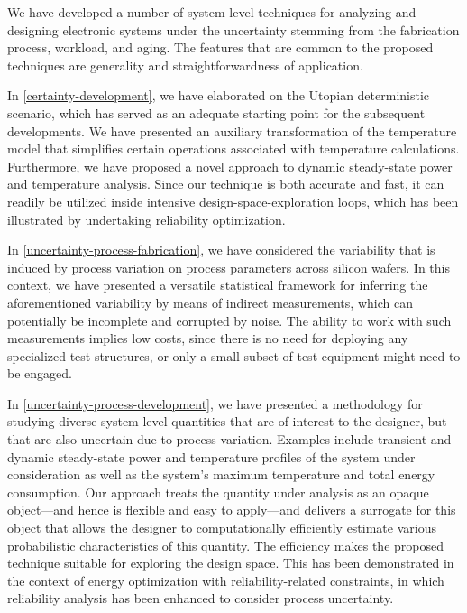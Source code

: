 We have developed a number of system-level techniques for analyzing and
designing electronic systems under the uncertainty stemming from the fabrication
process, workload, and aging. The features that are common to the proposed
techniques are generality and straightforwardness of application.

In \cref{certainty-development}, we have elaborated on the Utopian deterministic
scenario, which has served as an adequate starting point for the subsequent
developments. We have presented an auxiliary transformation of the temperature
model that simplifies certain operations associated with temperature
calculations. Furthermore, we have proposed a novel approach to dynamic
steady-state power and temperature analysis. Since our technique is both
accurate and fast, it can readily be utilized inside intensive
design-space-exploration loops, which has been illustrated by undertaking
reliability optimization.

In \cref{uncertainty-process-fabrication}, we have considered the variability
that is induced by process variation on process parameters across silicon
wafers. In this context, we have presented a versatile statistical framework for
inferring the aforementioned variability by means of indirect measurements,
which can potentially be incomplete and corrupted by noise. The ability to work
with such measurements implies low costs, since there is no need for deploying
any specialized test structures, or only a small subset of test equipment might
need to be engaged.

In \cref{uncertainty-process-development}, we have presented a methodology for
studying diverse system-level quantities that are of interest to the designer,
but that are also uncertain due to process variation. Examples include transient
and dynamic steady-state power and temperature profiles of the system under
consideration as well as the system's maximum temperature and total energy
consumption. Our approach treats the quantity under analysis as an opaque
object---and hence is flexible and easy to apply---and delivers a surrogate for
this object that allows the designer to computationally efficiently estimate
various probabilistic characteristics of this quantity. The efficiency makes the
proposed technique suitable for exploring the design space. This has been
demonstrated in the context of energy optimization with reliability-related
constraints, in which reliability analysis has been enhanced to consider process
uncertainty.

